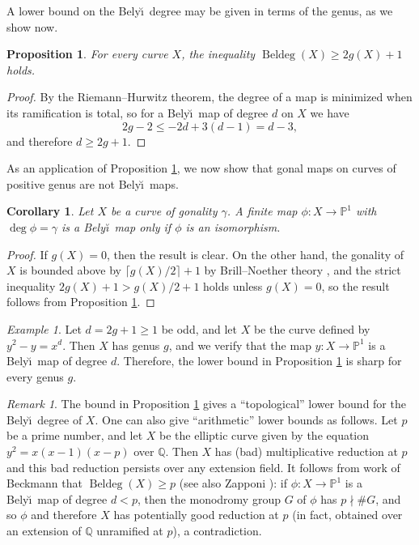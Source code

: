 \documentclass{amsproc}
\numberwithin{equation}{section}
\numberwithin{figure}{section}
\newtheorem{proposition}[equation]{Proposition}
\newtheorem{corollary}[equation]{Corollary}
\theoremstyle{definition}
\theoremstyle{remark}
\newtheorem{remark}[equation]{Remark}
\newtheorem{example}[equation]{Example}
\DeclareMathOperator{\Beldeg}{Beldeg}
\newcommand{\Q}{\QQ}
\newcommand\PP{\mathbb{P}}
\newcommand\QQ{\mathbb{Q}}
\newcommand{\p}{\mathbb{P}}
\renewcommand{\leq}{\leqslant}
\renewcommand{\geq}{\geqslant}
\newcommand{\Belyi}{Bely\u{\i}}
\begin{document}
A lower bound on the \Belyi\ degree may be given in terms of the genus, as we show now.

\begin{proposition}\label{prop:rh}
For every curve $X$, the inequality $\Beldeg(X) \geq 2g(X)+1$ holds.
\end{proposition}
\begin{proof}
By the Riemann--Hurwitz theorem, the degree of a map is minimized when its ramification is total, so for a \Belyi\ map of degree $d$ on $X$ we have
\[ 2g-2 \leq -2d+3(d-1) = d-3, \]
and therefore $d \geq 2g+1$.
\end{proof}

As an application of Proposition \ref{prop:rh}, we now show that gonal maps on curves of positive genus are not \Belyi\ maps.

\begin{corollary} Let $X$ be a curve of gonality $\gamma$.
A finite map $\phi\colon X \to \PP^1$ with $\deg \phi = \gamma$ is a \Belyi\ map only if $\phi$ is an isomorphism.
\end{corollary}

\begin{proof}
If $g(X)=0$, then the result is clear.  On the other hand, the gonality of $X$ is bounded above by $\lceil g(X)/2 \rceil+1$ by Brill--Noether theory \cite[Chapter V]{ACGH1}, and the strict inequality $2g(X)+1 > g(X)/2+1$ holds unless $g(X)=0$, so the result follows from Proposition \ref{prop:rh}.
\end{proof}

\begin{example} \label{example: Belyi is n}
Let $d=2g+1 \geq 1$ be odd, and let $X$ be the curve defined by $y^2-y=x^d$.  Then $X$ has genus $g$, and we verify that the map $y\colon X \to \p^1$ is a \Belyi\ map of degree $d$.  Therefore, the lower bound in Proposition \ref{prop:rh} is sharp for every genus $g$.
\end{example}

\begin{remark} The bound in Proposition \ref{prop:rh} gives a ``topological'' lower bound for the \Belyi\ degree of $X$. One can also give   ``arithmetic'' lower bounds as follows.  Let $p$ be a prime number, and let $X$ be the elliptic curve given by the equation $y^2=x(x-1)(x-p)$ over $\mathbb{Q}$.  Then $X$ has (bad) multiplicative reduction at $p$ and this bad reduction persists over any extension field.    It follows from work of Beckmann \cite{Beckmann} that $\Beldeg(X) \geq p$ (see also Zapponi \cite[Theorem~1.3]{Zapponi}): if $\phi\colon X \to \PP^1$ is a \Belyi\ map of degree $d<p$, then the monodromy group $G$ of $\phi$ has $p \nmid \#G$, and so $\phi$ and therefore $X$ has potentially good reduction at $p$ (in fact, obtained over an extension of $\Q$ unramified at $p$), a contradiction. 
\end{remark}
\end{document}
